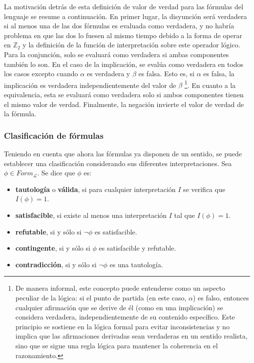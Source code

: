 \vspace{0.2cm}

La motivación detrás de esta definición de valor de verdad para las fórmulas del lenguaje se resume a continuación. En primer lugar, la disyunción será verdadera si al menos una de las dos fórmulas es evaluada como verdadera, y no habría problema en que las dos lo fuesen al mismo tiempo debido a la forma de operar en $\mathbb{Z}_2$ y la definición de la función de interpretación sobre este operador lógico. Para la conjunción, solo se evaluará como verdadera si ambas componentes también lo son. En el caso de la implicación, se evalúa como verdadera en todos los casos excepto cuando $\alpha$ es verdadera y $\beta$ es falsa. Esto es, si $\alpha$ es falsa, la implicación es verdadera independientemente del valor de $\beta$ \footnote{De manera informal, este concepto puede entenderse como un aspecto peculiar de la lógica: si el punto de partida (en este caso, $\alpha$) es falso, entonces cualquier afirmación que se derive de él (como en una implicación) se considera verdadera, independientemente de su contenido específico. Este principio se sostiene en la lógica formal para evitar inconsistencias y no implica que las afirmaciones derivadas sean verdaderas en un sentido realista, sino que se sigue una regla lógica para mantener la coherencia en el razonamiento.}. En cuanto a la equivalencia, esta se evaluará como verdadera solo si ambos componentes tienen el mismo valor de verdad. Finalmente, la negación invierte el valor de verdad de la fórmula.

\subsubsection{Clasificación de fórmulas}\label{subsubsection:lpropclassify}
Teniendo en cuenta que ahora las fórmulas ya disponen de un sentido, se puede establecer una clasificación considerando sus diferentes interpretaciones. Sea $\phi \in Form_{\mathcal{L}}$. Se dice que $\phi$ es:

\begin{itemize}
    \item \textbf{tautología} o \textbf{válida}, si para cualquier interpretación $I$ se verifica que $I(\phi) = 1$.
    \item \textbf{satisfacible}, si existe al menos una interpretación $I$ tal que $I(\phi) = 1$.
    \item \textbf{refutable}, si y sólo si $\neg\phi$ es satisfacible.
    \item \textbf{contingente}, si y sólo si $\phi$ es satisfacible y refutable.
    \item \textbf{contradicción}, si y sólo si $\neg\phi$ es una tautología.
\end{itemize}

